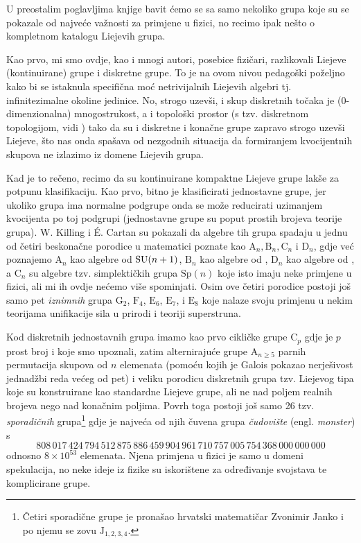 U preostalim poglavljima knjige bavit ćemo se sa samo nekoliko grupa
koje su se pokazale od najveće važnosti za primjene u fizici, no recimo
ipak nešto o kompletnom katalogu Liejevih grupa.

Kao prvo, mi smo ovdje, kao i mnogi autori, posebice fizičari, razlikovali
Liejeve (kontinuirane) grupe i diskretne grupe. To je na ovom nivou pedagoški
poželjno kako bi se istaknula specifična moć netrivijalnih Liejevih algebri tj. infinitezimalne
okoline jedinice. No, strogo uzevši, i skup diskretnih točaka je
(0-dimenzionalna) mnogostrukost, a i topološki prostor (s tzv. 
diskretnom topologijom, vidi \cite{Smolic:2024}) tako da su i diskretne
i konačne grupe zapravo strogo uzevši Liejeve, što nas onda spašava od
nezgodnih situacija da formiranjem kvocijentnih skupova ne izlazimo
iz domene Liejevih grupa.

Kad je to rečeno, recimo da su kontinuirane kompaktne Liejeve grupe
lakše za potpunu klasifikaciju. Kao prvo,
bitno je klasificirati jednostavne grupe, jer ukoliko grupa ima normalne
podgrupe onda se može reducirati uzimanjem kvocijenta po toj podgrupi
(jednostavne grupe su poput prostih brojeva teorije grupa). W. Killing i \'{E}. Cartan
su pokazali da algebre tih grupa spadaju u jednu od četiri beskonačne 
porodice u matematici poznate kao $\mathrm{A}_n, \mathrm{B}_n, \mathrm{C}_n$
i $\mathrm{D}_n$, gdje već poznajemo
$\mathrm{A}_n$ kao algebre od $\mathrm{SU}(n+1)$,  $\mathrm{B}_n$ kao algebre od ,
$\mathrm{D}_n$ kao algebre od , a $\mathrm{C}_n$ su algebre tzv. simplektičkih grupa
$\mathrm{Sp}(n)$ koje isto imaju neke primjene u fizici, ali mi ih ovdje
nećemo više spominjati. Osim ove četiri porodice postoji još samo
pet \emph{iznimnih} grupa $\mathrm{G}_2$, $\mathrm{F}_4$,
$\mathrm{E}_6$, $\mathrm{E}_7$, i $\mathrm{E}_8$ koje nalaze svoju primjenu
u nekim teorijama unifikacije sila u prirodi i teoriji superstruna.

Kod diskretnih jednostavnih grupa imamo kao prvo cikličke grupe $\mathrm{C}_{p}$
gdje je $p$ prost broj i koje smo upoznali, 
zatim alternirajuće grupe $\mathrm{A}_{n\ge 5}$ parnih permutacija skupova
od $n$ elemenata (pomoću kojih je Galois pokazao nerješivost jednadžbi
reda većeg od pet) i
veliku porodicu diskretnih grupa tzv. Liejevog tipa koje su konstruirane
kao standardne Liejeve grupe, ali ne nad poljem realnih brojeva nego
nad konačnim poljima. Povrh toga postoji još samo 26 tzv. \emph{sporadičnih}
grupa\footnote{Četiri sporadične grupe je pronašao hrvatski matematičar Zvonimir Janko
i po njemu se zovu $\mathrm{J}_{1, 2, 3, 4}$.} gdje je najveća od njih
čuvena grupa \emph{čudovište} (engl. \emph{monster}) s
\[ \textstyle
808\,017\,424\,794\,512\,875\,886\,459\,904\,961\,710\,757\,005\,754\,368\,000\,000\,000
\]
odnosno $8\times 10^{53}$ elemenata. Njena primjena u fizici je samo u domeni spekulacija, no
neke ideje iz fizike su iskorištene za određivanje svojstava te komplicirane
grupe.




